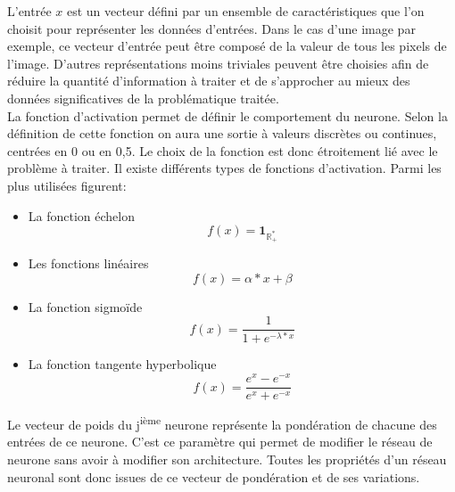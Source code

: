 \documentclass[a4paper,oneside]{report}
\begin{document}
                L'entrée $x$ est un vecteur défini par un ensemble de caractéristiques que l'on choisit pour représenter les données d'entrées. Dans le cas d'une image par exemple, ce vecteur d'entrée peut être composé de la valeur de tous les pixels de l'image. D'autres représentations moins triviales peuvent être choisies afin de réduire la quantité d'information à  traiter et de s'approcher au mieux des données significatives de la problématique traitée.\\

                La fonction d'activation permet de définir le comportement du neurone. Selon la définition de cette fonction on aura une sortie à  valeurs discrètes ou continues, centrées en 0 ou en 0,5. Le choix de la fonction est donc étroitement lié avec le problème à  traiter.
                Il existe différents types de fonctions d'activation. Parmi les plus utilisées figurent:
                \begin{itemize}
                    \item La fonction échelon
                    \begin{equation}
                        f(x)=\mathbf{1}_{\mathbb{R}^{*}_{+}}
                    \end{equation}
                    \item Les fonctions linéaires
                    \begin{equation}
                        f(x)=\alpha*x+\beta
                    \end{equation}
                    \item La fonction sigmoïde
                    \begin{equation}
                        f(x)=\frac{1}{1+e^{-\lambda*x}}
                    \end{equation}
                    \item La fonction tangente hyperbolique
                    \begin{equation}
                        f(x)=\frac{e^{x}-e^{-x}}{e^{x}+e^{-x}}
                    \end{equation}
                \end{itemize}

                Le vecteur de poids du j\textsuperscript{ième} neurone représente la pondération de chacune des entrées de ce neurone. C'est ce paramètre qui permet de modifier le réseau de neurone sans avoir à  modifier son architecture. Toutes les propriétés d'un réseau neuronal sont donc issues de ce vecteur de pondération et de ses variations.
\end{document}
